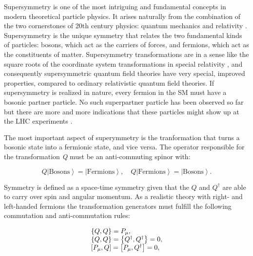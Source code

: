 Supersymmetry is one of the most intriguing and fundamental concepts in modern theoretical particle physics. It arises naturally from the combination of the two cornerstones of 20th century physics: quantum mechanics and relativity \cite{Miller:2013jra}. Supersymmetry is the unique symmetry that relates the two fundamental kinds of particles: bosons, which act as the carriers of forces, and fermions, which act as the constituents of matter. Supersymmetry transformations are in a sense like the square roots of the coordinate system transformations in special relativity \cite{Miller:2013jra}, and consequently supersymmetric quantum field theories have very special, improved properties, compared to ordinary relativistic quantum field theories. If supersymmetry is realized in nature, every fermion in the SM must have a bosonic partner particle. No such superpartner particle has been observed so far but there are more and more indications that these particles might show up at the LHC experiments \cite{Athron:2011wu}.

The most important aspect of superymmetry is the tranformation that turns a bosonic state into a fermionic state, and vice versa. The operator responsible for the transformation \textit{Q} must be an anti-commuting spinor with:

\begin{equation}
Q\left|\text{Bosons}\right> = \left|\text{Fermions}\right>, \quad Q\left|\text{Fermions}\right> = \left|\text{Bosons}\right>. 
\end{equation}

Symmetry is defined as a space-time symmetry given that the $Q$ and $Q^{\dagger}$ are able to carry over spin and angular momentum. As a realistic theory with right- and left-handed fermions the transformation generators must fulfill the following commutation and anti-commutation rules:

\begin{equation}
\begin{array}{l c l}
\left\{Q, Q\right\} = P_{\mu}, \\
\left\{Q, Q\right\} = \left\{Q^{\dagger}, Q^{\dagger}\right\} = 0, \\
\left[P_{\mu}, Q\right] = \left[P_{\mu}, Q^{\dagger}\right] = 0,
\end{array}
\end{equation}

